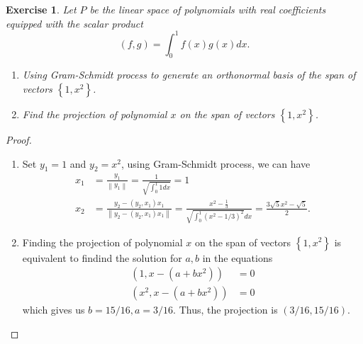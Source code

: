 \documentclass[11pt]{book}
\newtheorem{exercise}{Exercise}[section]
\theoremstyle{definition}
\numberwithin{equation}{chapter}
\begin{document}
\begin{exercise}
Let $P$ be the linear space of polynomials with real coefficients
equipped with the scalar product%
$$
\left(  f,g\right)  =\int_{0}^{1}f\left(  x\right)  g\left(  x\right)  dx.
$$
\begin{enumerate}[label=(\alph*)]
    \item Using Gram-Schmidt process to generate an orthonormal basis of the span of vectors $\left\{  1,x^{2}\right\}$.
    \item Find the projection of polynomial $x$ on the span of vectors $\left\{  1,x^{2}\right\}$.
\end{enumerate}
\end{exercise}
\begin{proof}
~\begin{enumerate}[label=(\alph*)]
    \item Set $y_1 = 1$ and $y_2 = x^2$, using Gram-Schmidt process, we can have 
    \begin{align*}
        x_1 & = \frac{y_1}{\left \|y_1\right \|} = \frac{1}{\sqrt{\int^1_0 1dx}} = 1 \\
        x_2 & = \frac{y_2-(y_2,x_1)x_1}{\left \|y_2-(y_2,x_1)x_1\right \|} = \frac{x^2 - \frac{1}{3}}{\sqrt{\int^1_0 (x^2 - 1/3)^2}dx} = \frac{3\sqrt{5}x^2 - \sqrt{5}}{2}.
    \end{align*}
    \item Finding the projection of polynomial $x$ on the span of vectors $\left\{  1,x^{2}\right\}$ is equivalent to findind the solution for $a,b$ in the equations
    \begin{align*}
        (1,x-(a+bx^2)) & = 0 \\
        (x^2,x-(a+bx^2)) & = 0 
    \end{align*}
    which gives us $b = 15/16, a = 3/16$. Thus, the projection is $\left(3/16,15/16\right)$.
\end{enumerate}
\end{proof}

\medskip
\end{document}
